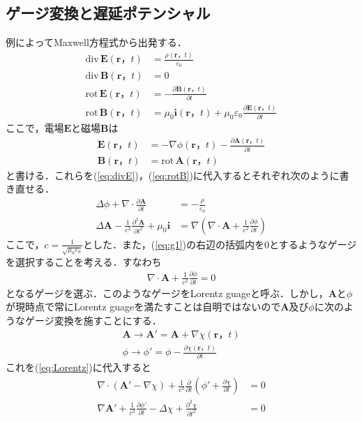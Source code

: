 \documentclass[a4j,10pt,oneside,openany]{jsbook}
\newcommand{\dive}{\mathrm{div}\,}  %
\newcommand{\rot}{\mathrm{rot}\,}  %
\newcommand{\vE}{\boldsymbol{E}}
\newcommand{\vB}{\boldsymbol{B}}
\newcommand{\vi}{\boldsymbol{i}}
\newcommand{\vr}{\boldsymbol{r}}
\newcommand{\vA}{\boldsymbol{A}}
\newcommand{\del}{\partial}
\begin{document}
{\subsection{ゲージ変換と遅延ポテンシャル}
例によってMaxwell方程式から出発する．
\begin{align}
  \dive \vE(\vr，t) &= \frac{\rho(\vr，t)}{\varepsilon_0}\label{eq:divE}\\
  \dive \vB(\vr，t) &= 0\\
  \rot \vE(\vr，t) &= -\frac{\del \vB (\vr，t)}{\del t}\\
  \rot \vB(\vr，t) &= \mu_0\vi (\vr，t)+\mu_0\varepsilon_0\frac{\del \vE (\vr，t)}{\del t}\label{eq:rotB}
\end{align}
ここで，電場$\vE$と磁場$\vB$は
\begin{align}
  \vE(\vr，t) &= -\nabla\phi(\vr，t)-\frac{\del \vA(\vr，t)}{\del t}\\
  \vB(\vr，t) &= \rot\vA(\vr，t)
\end{align}
と書ける．これらを(\ref{eq:divE})，(\ref{eq:rotB})に代入するとそれぞれ次のように書き直せる．
\begin{align}
  \Delta\phi+\nabla\cdot\frac{\del \vA}{\del t} &= -\frac{\rho}{\varepsilon_0}\label{eq:g0}\\
  \Delta \vA -\frac{1}{c^2}\frac{\del^2 \vA}{\del t^2}+\mu_0\vi&=\nabla\left(\nabla\cdot\vA+\frac{1}{c^2}\frac{\del \phi}{\del t}\right)\label{eq:g1}
\end{align}
ここで，$c=\frac{1}{\sqrt{\mu_0\varepsilon_0}}$とした．また，(\ref{eq:g1})の右辺の括弧内を0とするようなゲージを選択することを考える．すなわち
\begin{align}
  \nabla\cdot\vA+\frac{1}{c^2}\frac{\del \phi}{\del t}=0\label{eq:Lorentz}
\end{align}
となるゲージを選ぶ．このようなゲージをLorentz guageと呼ぶ．しかし，$\vA$と$\phi$が現時点で常にLorentz guageを満たすことは自明ではないので$\vA$及び$\phi$に次のようなゲージ変換を施すことにする．
\begin{align}
  \vA \rightarrow \vA'=\vA+\nabla\chi(\vr，t)\\
  \phi \rightarrow \phi' = \phi -\frac{\del \chi(\vr，t)}{\del t}
\end{align}
これを(\ref{eq:Lorentz})に代入すると
\begin{align}
  \nabla\cdot(\vA'-\nabla\chi)+\frac{1}{c^2}\frac{\del}{\del t}\left(\phi'+\frac{\del \chi}{\del t}\right)&=0\nonumber\\
  \nabla\vA'+\frac{1}{c^2}\frac{\del \phi'}{\del t}-\Delta\chi+\frac{\del^2\chi}{\del t^2} &= 0\label{eq:terms}

\end{align}}
\end{document}
